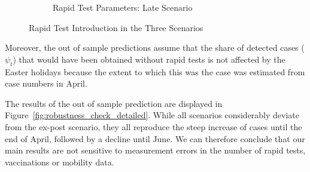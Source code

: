 \begin{figure}[ht]
\begin{subfigure}[b]{0.3\textwidth}
    \caption{Rapid Test Parameters: Late Scenario}
    \label{fig:robustness_late_params}
  \end{subfigure}

  \caption{Rapid Test Introduction in the Three Scenarios}
  \label{fig:robustness_check_rapid_test_params}

\end{figure}

Moreover, the out of sample predictions assume that the share of detected cases
($\psi_t$) that would have been obtained without rapid tests is not affected by the
Easter holidays because the extent to which this was the case was estimated from case
numbers in April.

The results of the out of sample prediction are displayed in
Figure~\ref{fig:robustness_check_detailed}. While all scenarios considerably deviate from
the ex-post scenario, they all reproduce the steep increase of cases until the end of
April, followed by a decline until June. We can therefore conclude that our main results
are not sensitive to measurement errors in the number of rapid tests, vaccinations or
mobility data.


